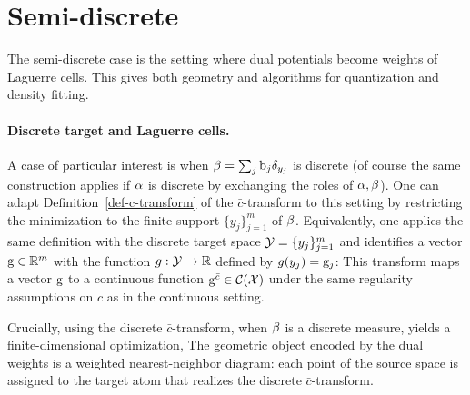 \section{Semi-discrete}


The semi-discrete case is the setting where dual potentials become weights of Laguerre cells. This gives both geometry and algorithms for quantization and density fitting.

\paragraph{Discrete target and Laguerre cells.}

A case of particular interest is when $\beta = \sum_j \mathrm{b}_j \delta_{y_j}$ is discrete (of course the same construction applies if $\alpha$ is discrete by exchanging the roles of $\alpha,\beta$).
%
One can adapt Definition~\ref{def-c-transform} of the $\bar c$-transform to this setting by restricting the minimization to the finite support $\{y_j\}_{j=1}^m$ of $\beta$. Equivalently, one applies the same definition with the discrete target space $\mathcal{Y}=\{y_j\}_{j=1}^m$ and identifies a vector $\mathrm{g}\in\mathbb{R}^m$ with the function $g:\mathcal{Y}\to\mathbb{R}$ defined by $g(y_j)=\mathrm{g}_j$:
This transform maps a vector $\mathrm{g}$ to a continuous function $\mathrm{g}^{\bar {c}} \in \mathcal{C}(\mathcal{X})$ under the same regularity assumptions on $c$ as in the continuous setting.

Crucially, using the discrete $\bar c$-transform, when $\beta$ is a discrete measure, yields a finite-dimensional optimization,
The geometric object encoded by the dual weights is a weighted nearest-neighbor diagram: each point of the source space is assigned to the target atom that realizes the discrete $\bar c$-transform.

